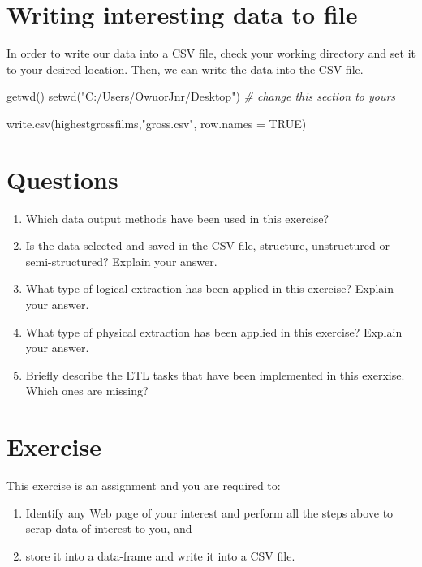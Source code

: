 \documentclass[
]{article}
\newenvironment{Shaded}{\begin{snugshade}}{\end{snugshade}}
\newcommand{\AttributeTok}[1]{\textcolor[rgb]{0.77,0.63,0.00}{#1}}
\newcommand{\CommentTok}[1]{\textcolor[rgb]{0.56,0.35,0.01}{\textit{#1}}}
\newcommand{\ConstantTok}[1]{\textcolor[rgb]{0.00,0.00,0.00}{#1}}
\newcommand{\FunctionTok}[1]{\textcolor[rgb]{0.00,0.00,0.00}{#1}}
\newcommand{\NormalTok}[1]{#1}
\newcommand{\StringTok}[1]{\textcolor[rgb]{0.31,0.60,0.02}{#1}}
\providecommand{\tightlist}{%
  \setlength{\itemsep}{0pt}\setlength{\parskip}{0pt}}
\begin{document}
\hypertarget{writing-interesting-data-to-file}{%
\section{Writing interesting data to
file}\label{writing-interesting-data-to-file}}

In order to write our data into a CSV file, check your working directory
and set it to your desired location. Then, we can write the data into
the CSV file.

\begin{Shaded}
\begin{Highlighting}[]
\FunctionTok{getwd}\NormalTok{()}
\FunctionTok{setwd}\NormalTok{(}\StringTok{"C:/Users/OwuorJnr/Desktop"}\NormalTok{) }\CommentTok{\# change this section to yours}

\FunctionTok{write.csv}\NormalTok{(highestgrossfilms,}\StringTok{"gross.csv"}\NormalTok{, }\AttributeTok{row.names =} \ConstantTok{TRUE}\NormalTok{)}
\end{Highlighting}
\end{Shaded}

\hypertarget{questions}{%
\section{Questions}\label{questions}}

\begin{enumerate}
\def\labelenumi{\arabic{enumi}.}
\tightlist
\item
  Which data output methods have been used in this exercise?
\item
  Is the data selected and saved in the CSV file, structure,
  unstructured or semi-structured? Explain your answer.
\item
  What type of logical extraction has been applied in this exercise?
  Explain your answer.
\item
  What type of physical extraction has been applied in this exercise?
  Explain your answer.
\item
  Briefly describe the ETL tasks that have been implemented in this
  exerxise. Which ones are missing?
\end{enumerate}

\hypertarget{exercise}{%
\section{Exercise}\label{exercise}}

This exercise is an assignment and you are required to:

\begin{enumerate}
\def\labelenumi{\alph{enumi}.}
\item
  Identify any Web page of your interest and perform all the steps above
  to scrap data of interest to you, and
\item
  store it into a data-frame and write it into a CSV file.
\end{enumerate}
\end{document}
